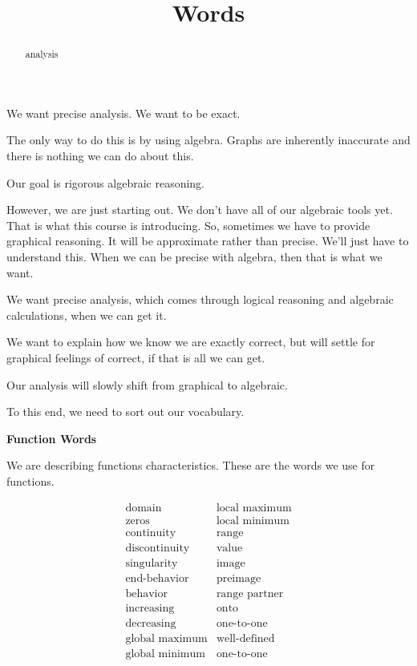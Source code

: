\documentclass{ximera}
\title{Words}
\begin{document}
\begin{abstract}
analysis
\end{abstract}
\maketitle






We want precise analysis.  We want to be exact. 


The only way to do this is by using algebra.  Graphs are inherently inaccurate and there is nothing we can do about this. 


Our goal is rigorous algebraic reasoning. 



However, we are just starting out.  We don't have all of our algebraic tools yet.  That is what this course is introducing.  So, sometimes we have to provide graphical reasoning.  It will be approximate rather than precise.  We'll just have to understand this.  When we can be precise with algebra, then that is what we want. 


We want precise analysis, which comes through logical reasoning and algebraic calculations, when we can get it. 


We want to explain how we know we are exactly correct, but will settle for graphical feelings of correct, if that is all we can get. 

Our analysis will slowly shift from graphical to algebraic.


To this end, we need to sort out our vocabulary.


\textbf{\textcolor{red!75!green}{Function Words}}

We are describing functions characteristics. These are the words we use for functions.


\[
\begin{array}{ll}
\text{domain}  & \text{local maximum}  \\
\text{zeros}  & \text{local minimum} \\
\text{continuity}    &  \text{range} \\
\text{discontinuity}  & \text{value} \\
\text{singularity}   & \text{image} \\
\text{end-behavior} & \text{preimage} \\
\text{behavior} & \text{range partner} \\
\text{increasing} & \text{onto} \\
\text{decreasing} &  \text{one-to-one} \\
\text{global maximum} &  \text{well-defined} \\
\text{global minimum} &  \text{one-to-one} 

\end{array}
\]
\end{document}
